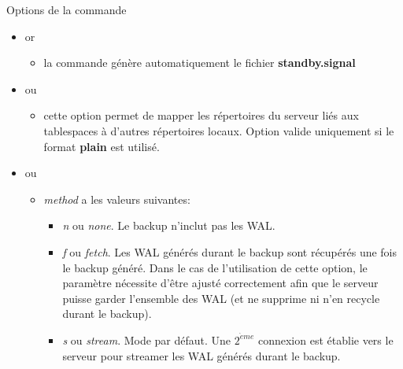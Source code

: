 
\begin{frame}{Options de la commande }

\begin{itemize}
   \item {} or 
   \begin{itemize}
      \item la commande génère automatiquement le fichier \textbf{standby.signal}
   \end{itemize}
   \item {} ou 
   \begin{itemize}
      \item cette option permet de mapper les répertoires du serveur liés aux tablespaces à d'autres répertoires locaux. Option valide uniquement si le format \textbf{plain} est utilisé. 
   \end{itemize}
   \item {} ou 
   \begin{itemize}
   \item \textit{method} a les valeurs suivantes:
      \begin{itemize}
         \item  \textit{n} ou \textit{none}. Le backup n'inclut pas les WAL.
         \item  \textit{f} ou \textit{fetch}. Les WAL générés durant le backup sont récupérés une fois le backup généré. Dans le cas de l'utilisation de cette option, le paramètre  nécessite d'être ajusté correctement afin que le serveur puisse garder l'ensemble des WAL (et ne supprime ni n'en recycle durant le backup).
         \item  \textit{s} ou \textit{stream}. Mode par défaut. Une $2^{\grave{e}me}$ connexion est établie vers le serveur pour streamer les WAL générés durant le backup.
      \end{itemize}
   \end{itemize}
\end{itemize}

\end{frame}


